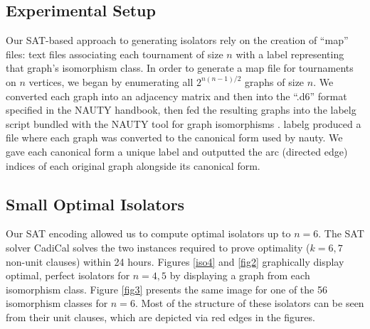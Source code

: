 \documentclass[conference]{IEEEtran}
\begin{document}
\subsection{Experimental Setup}
Our SAT-based approach to generating isolators rely on the creation of ``map'' files: text files associating each tournament of size $n$ with a label representing that graph's isomorphism class. In order to generate a map file for tournaments on $n$ vertices, we began by enumerating all $2^{n(n-1)/2}$ graphs of size $n$. We converted each graph into an adjacency matrix and then into the ``.d6'' format specified in the NAUTY handbook, then fed the resulting graphs into the labelg script bundled with the NAUTY tool for graph isomorphisms \cite{ref_nauty}. labelg produced a file where each graph was converted to the canonical form used by nauty. We gave each canonical form a unique label and outputted the arc (directed edge) indices of each original graph alongside its canonical form. 


\subsection{Small Optimal Isolators}

Our SAT encoding allowed us to compute optimal isolators up to $n=6$. The SAT solver CadiCal \cite{cadical} solves the two instances required to prove optimality ($k=6,7$ non-unit clauses) within 24 hours. Figures \ref{iso4} and \ref{fig2} graphically display optimal, perfect isolators for $n=4,5$ by displaying a graph from each isomorphism class. Figure \ref{fig3} presents the same image for one of the 56 isomorphism classes for $n=6$. Most of the structure of these isolators can be seen from their unit clauses, which are depicted via red edges in the figures. 
\end{document}
